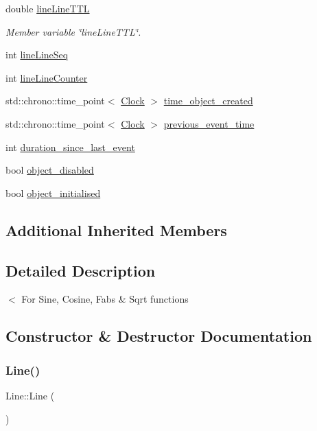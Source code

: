 \begin{DoxyCompactItemize}
double \mbox{\hyperlink{classLine_afb3c20f2415b40bc800ae36796b2f7c7}{line\+Line\+T\+TL}}
\begin{DoxyCompactList}\small\item\em Member variable \char`\"{}line\+Line\+T\+T\+L\char`\"{}. \end{DoxyCompactList}\item 
int \mbox{\hyperlink{classLine_a46a8187d5ccc8bf0dc9bc041836f241f}{line\+Line\+Seq}}
\item 
int \mbox{\hyperlink{classLine_a4fb7e6f35d49e0113755913b5179f922}{line\+Line\+Counter}}
\item 
std\+::chrono\+::time\+\_\+point$<$ \mbox{\hyperlink{universe_8h_a0ef8d951d1ca5ab3cfaf7ab4c7a6fd80}{Clock}} $>$ \mbox{\hyperlink{classLine_ad1d89d2499cf9455fc2499078e0acc32}{time\+\_\+object\+\_\+created}}
\item 
std\+::chrono\+::time\+\_\+point$<$ \mbox{\hyperlink{universe_8h_a0ef8d951d1ca5ab3cfaf7ab4c7a6fd80}{Clock}} $>$ \mbox{\hyperlink{classLine_a1d6ddf845443fa6baa5d15d14baed9f8}{previous\+\_\+event\+\_\+time}}
\item 
int \mbox{\hyperlink{classLine_ab4c19eb7e67615c609de20d98a2d0b5f}{duration\+\_\+since\+\_\+last\+\_\+event}}
\item 
bool \mbox{\hyperlink{classLine_ae9070a9da0afebb31910e31e62019301}{object\+\_\+disabled}}
\item 
bool \mbox{\hyperlink{classLine_a53a3368bd95b126c281eea4736ebc282}{object\+\_\+initialised}}
\end{DoxyCompactItemize}
\subsection*{Additional Inherited Members}


\subsection{Detailed Description}
$<$ For Sine, Cosine, Fabs \& Sqrt functions 

\subsection{Constructor \& Destructor Documentation}
\mbox{\label{classLine_acc11b8a429d8cdd63ba6803dff5602b3}} 
\subsubsection{\texorpdfstring{Line()}{Line()}\hspace{0.1cm}{\footnotesize\ttfamily [1/4]}}
{\footnotesize\ttfamily Line\+::\+Line (\begin{DoxyParamCaption}{ }\end{DoxyParamCaption})\hspace{0.3cm}{\ttfamily [inline]}}

